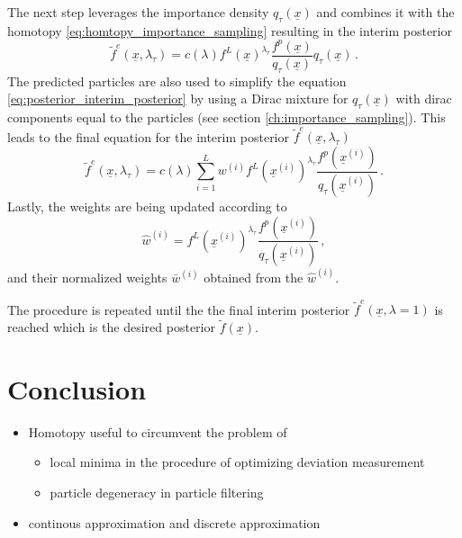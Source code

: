 \documentclass[a4paper]{IEEEtran}
\begin{document}
The next step leverages the importance density $q_{\tau}(\underline{x})$ and
combines it with the homotopy \eqref{eq:homtopy_importance_sampling} resulting in the interim posterior
\begin{equation}
    \tilde{f}^{e}(\underline{x}, \lambda_{\tau}) = c(\lambda)f^L(\underline{x})^{\lambda_{\tau}}\frac{f^p(\underline{x})}{q_{\tau}(\underline{x})}q_{\tau}(\underline{x}) \,.
    \label{eq:posterior_interim_posterior}
\end{equation}
The predicted particles are also used to simplify the equation \eqref{eq:posterior_interim_posterior} by using a Dirac mixture for $q_{\tau}(\underline{x})$ with dirac components equal to the particles (see section \ref{ch:importance_sampling}).
This leads to the final equation for the interim posterior $\tilde{f}^{e}(\underline{x}, \lambda_{\tau})$
\begin{equation}
    \tilde{f}^{e}(\underline{x}, \lambda_{\tau}) = c(\lambda) \sum_{i=1}^{L}w^{(i)}f^L(\underline{x}^{(i)})^{\lambda_{\tau}}\frac{f^p(\underline{x}^{(i)})}{q_{\tau}(\underline{x}^{(i)})} \,.
    \label{eq:posterior_interim_posterior}
\end{equation}
Lastly, the weights are being updated according to
\begin{equation}
    \hat{w}^{(i)}= f^L(\underline{x}^{(i)})^{\lambda_{\tau}}\frac{f^p(\underline{x}^{(i)})}{q_{\tau}(\underline{x}^{(i)})} \,,
    \label{eq:posterior_update_weights}
\end{equation}
and their normalized weights $\bar{w}^{(i)}$ obtained from the $\hat{w}^{(i)}$.

The procedure is repeated until the the final interim posterior $\tilde{f}^{e}(\underline{x}, \lambda=1)$ is reached which is the desired posterior $\tilde{f}(\underline{x})$.
\section{Conclusion}
\label{ch:conclusion}
\begin{itemize}
    \item Homotopy useful to circumvent the problem of 
    \begin{itemize}
        \item  local minima in the procedure of optimizing deviation measurement
        \item  particle degeneracy in particle filtering    
    \end{itemize}
    \item continous approximation and discrete approximation
\end{itemize}




\end{document}
